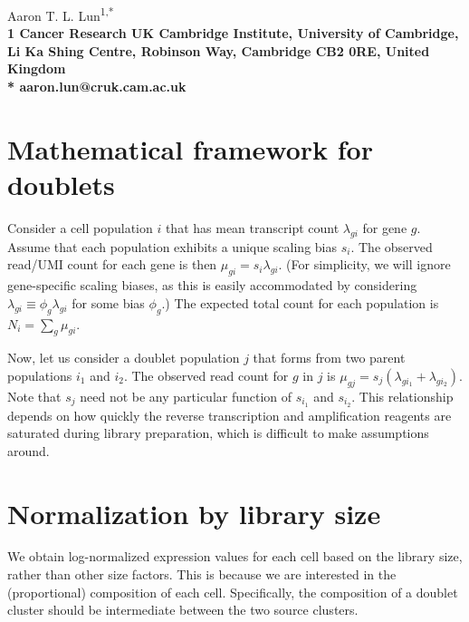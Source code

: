 \documentclass{article}
\begin{document}
\vspace*{0.35in}

\begin{flushleft}
{\Large
\textbf{}
}
\newline

Aaron T. L. Lun\textsuperscript{1,*}
\\
\bigskip
\bf{1} Cancer Research UK Cambridge Institute, University of Cambridge, Li Ka Shing Centre, Robinson Way, Cambridge CB2 0RE, United Kingdom
\\
\bigskip
* aaron.lun@cruk.cam.ac.uk

\end{flushleft}

\section{Mathematical framework for doublets}
Consider a cell population $i$ that has mean transcript count $\lambda_{gi}$ for gene $g$.
Assume that each population exhibits a unique scaling bias $s_i$.
The observed read/UMI count for each gene is then $\mu_{gi}=s_i\lambda_{gi}$.
(For simplicity, we will ignore gene-specific scaling biases, as this is easily accommodated by considering $\lambda_{gi} \equiv \phi_g \lambda_{gi}$ for some bias $\phi_g$.)
The expected total count for each population is $N_i = \sum_g \mu_{gi}$.

Now, let us consider a doublet population $j$ that forms from two parent populations $i_1$ and $i_2$.
The observed read count for $g$ in $j$ is $\mu_{gj} = s_j (\lambda_{gi_1} + \lambda_{gi_2})$.
Note that $s_j$ need not be any particular function of $s_{i_1}$ and $s_{i_2}$.
This relationship depends on how quickly the reverse transcription and amplification reagents are saturated during library preparation, which is difficult to make assumptions around.

\section{Normalization by library size}
We obtain log-normalized expression values for each cell based on the library size, rather than other size factors.
This is because we are interested in the (proportional) composition of each cell.
Specifically, the composition of a doublet cluster should be intermediate between the two source clusters.
\end{document}
